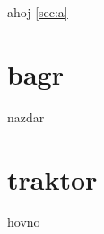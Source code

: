\documentclass{article}
\begin{document}
ahoj \ref{sec:a}
\section{bagr}
nazdar
\clearpage
\section{traktor}
hovno
\end{document}
